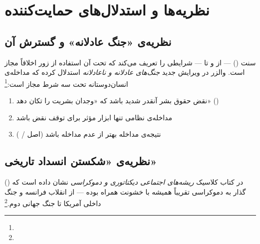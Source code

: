 \section{نظریه‌ها و استدلال‌های حمایت‌کننده}
\label{sec:ch15-theories}

\subsection{نظریه‌ی «جنگ عادلانه» و گسترش آن}
\label{subsec:ch15-just-war}

سنت  () — از  و  تا  — شرایطی را تعریف می‌کند که تحت آن استفاده از زور اخلاقاً مجاز است. والزر در ویرایش جدید \textit{جنگ‌های عادلانه و ناعادلانه} استدلال کرده که مداخله‌ی انسان‌دوستانه تحت سه شرط مجاز است:\footnote{}

\begin{enumerate}
\item نقض حقوق بشر آنقدر شدید باشد که «وجدان بشریت را تکان دهد» ()
\item مداخله‌ی نظامی تنها ابزار مؤثر برای توقف نقض باشد
\item نتیجه‌ی مداخله بهتر از عدم مداخله باشد (اصل  / )
\end{enumerate}

\subsection{نظریه‌ی «شکستن انسداد تاریخی»}
\label{subsec:ch15-historical-deadlock}

 () در کتاب کلاسیک \textit{ریشه‌های اجتماعی دیکتاتوری و دموکراسی} نشان داده است که گذار به دموکراسی تقریباً همیشه با خشونت همراه بوده — از انقلاب فرانسه و جنگ داخلی آمریکا تا جنگ جهانی دوم.\footnote{}


